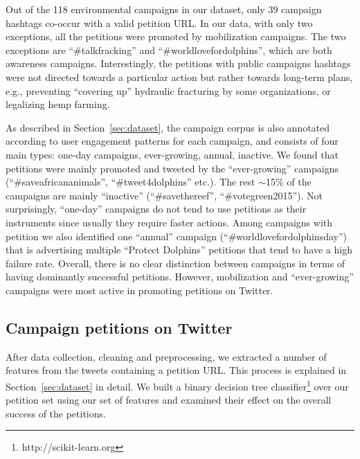Out of the 118 environmental campaigns in our dataset, only 39 campaign hashtags co-occur with a valid petition URL.
In our data, with only two exceptions, all the petitions were promoted by mobilization campaigns. The two exceptions are ``\#talkfracking'' and ``\#worldlovefordolphins'', which are both awareness campaigns.
Interestingly, the petitions with public campaigns hashtags were not directed towards a particular action but rather towards long-term plans, e.g., preventing ``covering up'' hydraulic fracturing by some organizations, or legalizing hemp farming.

As described in  Section~\ref{sec:dataset}, the campaign corpus is also annotated according to user engagement patterns for each campaign, and consists of four main types: one-day campaigns, ever-growing, annual, inactive.
We found that petitions were mainly promoted and tweeted by the  ``ever-growing'' campaigns (``\#saveafricananimals'', ``\#tweet4dolphins'' etc.).
The rest $\sim$15\% of the campaigns are mainly ``inactive'' (``\#savethereef'', ``\#votegreen2015'').
Not surprisingly, ``one-day'' campaigns do not tend to use petitions as their instruments since usually they require faster actions.
Among campaigns with petition we also identified one ``annual'' campaign (``\#worldlovefordolphinsday'') that is advertising multiple ``Protect Dolphins'' petitions that tend to have a high failure rate.
Overall, there is no clear distinction between campaigns in terms of having dominantly successful petitions. However, mobilization and ``ever-growing'' campaigns were most active in promoting petitions on Twitter.

\subsection{Campaign petitions on Twitter}
After data collection, cleaning and preprocessing, we extracted a number of features from the tweets containing a petition URL.
This process is explained in Section~\ref{sec:dataset} in detail.
We built a binary decision tree classifier\footnote{ http://scikit-learn.org } over our petition set using our set of features and examined their effect on the overall success of the petitions.


